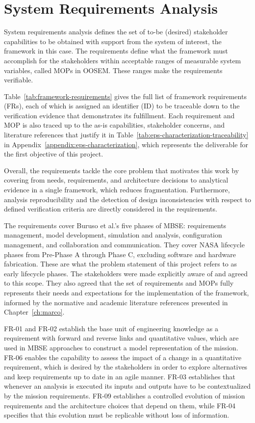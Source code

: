 \section{System Requirements Analysis}
\label{section:analyze-system-requirements}
System requirements analysis defines the set of to-be (desired) stakeholder capabilities to be obtained with support from the system of interest, the framework in this case.
The requirements define what the framework must accomplish for the stakeholders within acceptable ranges of measurable system variables, called MOPs in OOSEM.
These ranges make the requirements verifiable.

Table~\ref{tab:framework-requirements} gives the full list of framework requirements (FRs), each of which is assigned an identifier (ID) to be traceable down to the verification evidence that demonstrates its fulfillment.
Each requirement and MOP is also traced up to the as-is capabilities, stakeholder concerns, and literature references that justify it in Table~\ref{tab:eps-characterization-traceability} in Appendix~\ref{appendix:eps-characterization}, which represents the deliverable for the first objective of this project.

Overall, the requirements tackle the core problem that motivates this work by covering from needs, requirements, and architecture decisions to analytical evidence in a single framework, which reduces fragmentation.
Furthermore, analysis reproducibility and the detection of design inconsistencies with respect to defined verification criteria are directly considered in the requirements.

The requirements cover Buruso et al.'s five phases of MBSE: requirements management, model development, simulation and analysis, configuration management, and collaboration and communication.
They cover NASA lifecycle phases from Pre-Phase A through Phase C, excluding software and hardware fabrication. These are what the problem statement of this project refers to as early lifecycle phases.
The stakeholders were made explicitly aware of and agreed to this scope.
They also agreed that the set of requirements and MOPs fully represents their needs and expectations for the implementation of the framework, informed by the normative and academic literature references presented in Chapter~\ref{ch:marco}.

FR-01 and FR-02 establish the base unit of engineering knowledge as a requirement with forward and reverse links and quantitative values, which are used in MBSE approaches to construct a model representation of the mission.
FR-06 enables the capability to assess the impact of a change in a quantitative requirement, which is desired by the stakeholders in order to explore alternatives and keep requirements up to date in an agile manner.
FR-03 establishes that whenever an analysis is executed its inputs and outputs have to be contextualized by the mission requirements.
FR-09 establishes a controlled evolution of mission requirements and the architecture choices that depend on them, while FR-04 specifies that this evolution must be replicable without loss of information.

